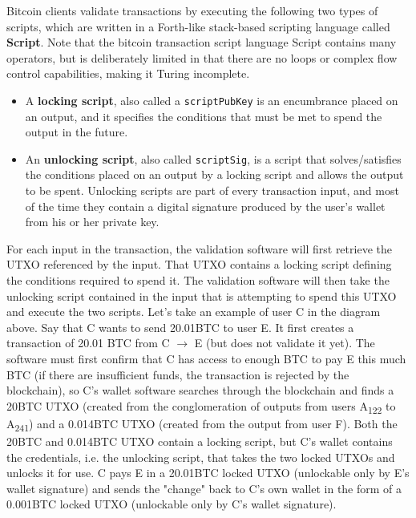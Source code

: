 \documentclass{article}
\newcounter{example}[section]
\begin{document}
    Bitcoin clients validate transactions by executing the following two types of scripts, which are written in a Forth-like stack-based scripting language called \textbf{Script}. Note that the bitcoin transaction script language Script contains many operators, but is deliberately limited in that there are no loops or complex flow control capabilities, making it Turing incomplete.

    \begin{itemize}
      \item A \textbf{locking script}, also called a \texttt{scriptPubKey} is an encumbrance placed on an output, and it specifies the conditions that must be met to spend the output in the future.
      \item An \textbf{unlocking script}, also called \texttt{scriptSig}, is a script that solves/satisfies the conditions placed on an output by a locking script and allows the output to be spent. Unlocking scripts are part of every transaction input, and most of the time they contain a digital signature produced by the user's wallet from his or her private key.
    \end{itemize}

    For each input in the transaction, the validation software will first retrieve the UTXO referenced by the input. That UTXO contains a locking script defining the conditions required to spend it. The validation software will then take the unlocking script contained in the input that is attempting to spend this UTXO and execute the two scripts. Let's take an example of user C in the diagram above. Say that C wants to send 20.01BTC to user E. It first creates a transaction of 20.01 BTC from C $\rightarrow$ E (but does not validate it yet). The software must first confirm that C has access to enough BTC to pay E this much BTC (if there are insufficient funds, the transaction is rejected by the blockchain), so C's wallet software searches through the blockchain and finds a 20BTC UTXO (created from the conglomeration of outputs from users A\textsubscript{122} to A\textsubscript{241}) and a 0.014BTC UTXO (created from the output from user F). Both the 20BTC and 0.014BTC UTXO contain a locking script, but C's wallet contains the credentials, i.e. the unlocking script, that takes the two locked UTXOs and unlocks it for use. C pays E in a 20.01BTC locked UTXO (unlockable only by E's wallet signature) and sends the "change" back to C's own wallet in the form of a 0.001BTC locked UTXO (unlockable only by C's wallet signature).
\end{document}
